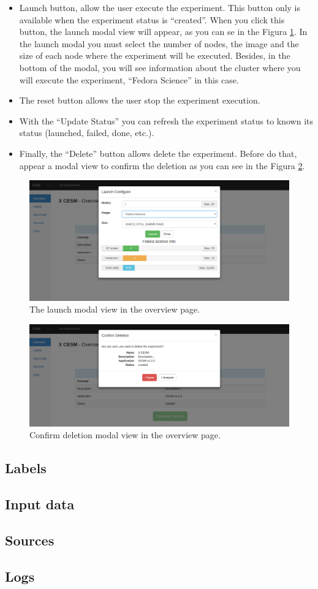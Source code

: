 \documentclass[11pt]{article}
\begin{document}
\begin{itemize}
	\item Launch button, allow the user execute the experiment. This button only is available when the experiment status is ``created''. When you click this button, the launch modal view will appear, as you can se in the Figura \ref{fig:overview-launch}. In the launch modal you must select the number of nodes, the image and the size of each node where the experiment will be executed. Besides, in the bottom of the modal, you will see information about the cluster where you will execute the experiment, ``Fedora Science'' in this case.
	\item The reset button allows the user stop the experiment execution.
	\item With the ``Update Status'' you can refresh the experiment status to known its status (launched, failed, done, etc.).
	\item Finally, the ``Delete'' button allows delete the experiment. Before do that, appear a modal view to confirm the deletion as you can see in the Figura \ref{fig:overview-delete}.
\end{itemize}

\begin{figure}[htp]
	\centering
	\includegraphics[width=\linewidth]{img/overview-launch}
	\caption{The launch modal view in the overview page.}
	\label{fig:overview-launch}
\end{figure}
\begin{figure}[htp]
	\centering
	\includegraphics[width=\linewidth]{img/overview-delete}
	\caption{Confirm deletion modal view in the overview page.}
	\label{fig:overview-delete}
\end{figure}
\subsection{Labels}\label{sec:labels}
\subsection{Input data}\label{sec:inputData}
\subsection{Sources}\label{sec:sources}
\subsection{Logs}\label{sec:logs}
\end{document}
